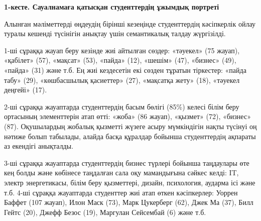 {\bfseries 1-кесте. Сауалнамаға қатысқан студенттердің ұжымдық портреті}

% 
% 
% 
% 
% 
% 
% 
% 
% 
% 
% 
% 
% 
% 
% 
% 

Алынған мәліметтерді өңдеудің бірінші кезеңінде студенттердің
кәсіпкерлік ойлау туралы кешенді түсінігін анықтау үшін семантикалық
талдау жүргізілді.

1-ші сұраққа жауап беру кезінде жиі айтылған сөздер: «тәуекел» (75
жауап), «қабілет» (57), «мақсат» (53), «пайда» (12), «шешім» (47),
«бизнес» (49), «пайда» (31) және т.б. Ең жиі кездесетін екі сөзден
тұратын тіркестер: «пайда табу» (29), «көшбасшылық қасиеттер» (27),
«мақсатқа жету» (18), «тәуекел деңгейі» (17).

2-ші сұраққа жауаптарда студенттердің басым бөлігі (85\%) келесі білім
беру ортасының элементтерін атап өтті: «жоба» (86 жауап), «қызмет» (72),
«бизнес» (87). Оқушылардың жобалық қызметті жүзеге асыру мүмкіндігін
нақты түсінуі оң нәтиже болып табылады, алайда басқа құралдар бойынша
студенттердің ақпараты аз екендігі анықталды.

3-ші сұраққа жауаптарда студенттердің бизнес түрлері бойынша таңдаулары
өте кең болды және көбінесе таңдалған сала оқу мамандығына сәйкес келді:
IT, электр энергетикасы, білім беру қызметтері, дизайн, психология,
аударма ісі және т.б. 4-ші сұраққа жауаптарда студенттер жиі атап өткен
кәсіпкерлер: Уоррен Баффет (107 жауап), Илон Маск (73), Марк Цукерберг
(62), Джек Ма (37), Билл Гейтс (20), Джефф Безос (19), Маргулан
Сейсембай (6) және т.б.

